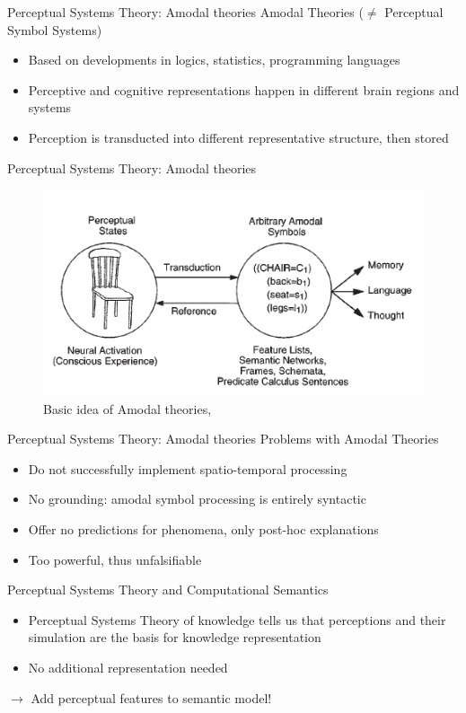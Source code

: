 \documentclass[12pt,a4paper]{beamer}
\begin{document}
\begin{frame}{Perceptual Systems Theory: Amodal theories }
Amodal Theories ($\neq$ Perceptual Symbol Systems)
\begin{itemize}
\item Based on developments in logics, statistics, programming languages
\item Perceptive and cognitive representations happen in different brain regions and systems
\item Perception is transducted into different representative structure, then stored
\end{itemize}
\end{frame}

\begin{frame}{Perceptual Systems Theory: Amodal theories}
\begin{figure}
\includegraphics[scale=0.8]{barsalou_figure_2_amodal_symbol_systems.png}
\caption{Basic idea of Amodal theories, \cite{barsalou}}
\end{figure}
\end{frame}

\begin{frame}{Perceptual Systems Theory: Amodal theories}
Problems with Amodal Theories
\begin{itemize}
\item Do not successfully implement spatio-temporal processing
\item No grounding: amodal symbol processing is entirely syntactic
\item Offer no predictions for phenomena, only post-hoc explanations
\item Too powerful, thus unfalsifiable
\end{itemize}
\end{frame}


\begin{frame}{Perceptual Systems Theory and Computational Semantics}
\begin{itemize}
\item Perceptual Systems Theory of knowledge tells us that perceptions and their simulation are the basis for knowledge representation
\item No additional representation needed
\end{itemize}
$\to$ Add perceptual features to semantic model!
\end{frame}
\end{document}
